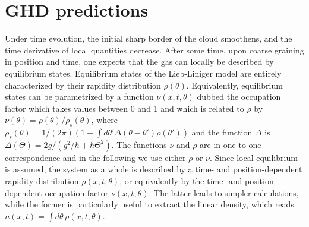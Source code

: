 \documentclass[submission, Phys]{SciPost}
\begin{document}
\section{GHD predictions}\label{sec.GHDpredictions}
Under time evolution, the initial sharp border of the cloud smoothens, and the time
derivative of local quantities decrease. 
After some time, %
upon coarse graining in position and time, one expects that the gas can locally be described by equilibrium states.
Equilibrium states of the Lieb-Liniger model are entirely characterized 
by their rapidity distribution $\rho(\theta)$.
Equivalently, equilibrium states can be parametrized by  a function $\nu(x,t,\theta)$ dubbed the occupation factor which takes values between 0 and 1 and which is related to  
$\rho$ by $\nu(\theta)=\rho(\theta)/\rho_s(\theta)$, where $\rho_s(\theta)=
1/(2\pi) \left (1+ \int d\theta' \Delta(\theta-\theta') \rho(\theta')\right ) $
and the function $\Delta$ is $\Delta(\Theta)=2g/(g^2/\hbar+\hbar\Theta^2)$. 
 The functions $\nu$ and $\rho$ are in one-to-one correspondence and in the following we use either $\rho$ or $\nu$. 
Since local equilibrium is assumed, the system as a whole is described by a time- and position-dependent rapidity distribution $\rho(x,t,\theta)$, or equivalently by the 
time- and position-dependent occupation factor $\nu(x,t,\theta)$. The latter leads to simpler calculations, while the former is particularly useful to extract the linear density, which reads $n(x,t)=\int d\theta \, \rho(x,t,\theta)$.
\end{document}

